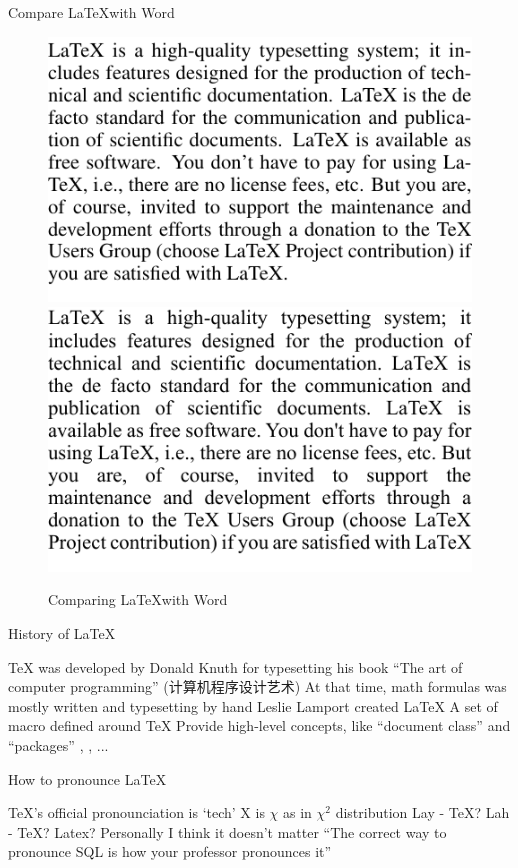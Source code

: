 \documentclass[scheme=plain,aspectratio=169]{ctexbeamer}
\let\OriginLaTeX\LaTeX
\renewcommand\LaTeX{\textrm{\OriginLaTeX\xspace}}
\begin{document}
\begin{frame}{Compare \LaTeX with Word}
    \begin{figure}
        \centering
        \includegraphics[width=.4\linewidth]{knuth-line-breaking-demo.pdf} %
        \hspace{1cm}
        \includegraphics[width=.4\linewidth]{knuth-line-breaking-demo-word.pdf}
        \caption{Comparing \LaTeX with Word}
    \end{figure}
\end{frame}

\begin{frame}{History of \LaTeX}
    \begin{outline}
        \1 \textrm{\TeX} was developed by Donald Knuth for typesetting his book ``The art of computer programming''
        \ifbjut (计算机程序设计艺术) \fi
            \2 At that time, math formulas was mostly written and typesetting by hand
        \1 Leslie Lamport created \LaTeX
            \2 A set of macro defined around \textrm{\TeX}
            \2 Provide high-level concepts, like ``document class'' and ``packages''
        \1 \textrm{\XeLaTeX, \LuaLaTeX}, ...
    \end{outline}
\end{frame}

\begin{frame}{How to pronounce \LaTeX}
    \begin{outline}
        \1 TeX's official pronounciation is `tech'
            \2 X is $\chi$ as in $\chi^2$ distribution
        \1 Lay - TeX?
        \1 Lah - TeX?
        \1 Latex?
        \1 Personally I think it doesn't matter
            \2 ``The correct way to pronounce SQL is how your professor pronounces it''
    \end{outline}
\end{frame}
\end{document}
